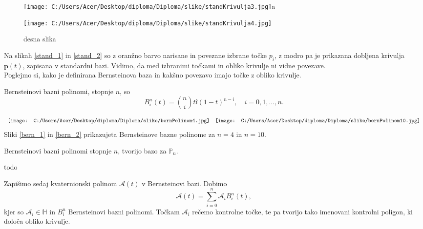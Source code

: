 \documentclass[mat1]{fmfdelo}
\newcommand{\HH}{\mathbb H}
\newcommand{\pp}{\boldsymbol p}
\newcommand{\A}{\mathcal A}
\begin{document}
\begin{figure}[ht!]

\texttt{[image: C:/Users/Acer/Desktop/diploma/Diploma/slike/standKrivulja3.jpg]}{a}

\end{figure}
 \begin{figure}[ht!]
 	\texttt{[image: C:/Users/Acer/Desktop/diploma/Diploma/slike/standKrivulja4.jpg]}
 	\caption{desna slika}
 \end{figure}


Na slikah \ref{stand_1} in \ref{stand_2} so z oranžno barvo narisane in povezane izbrane točke $p_i$, z modro pa je prikazana dobljena krivulja $\pp(t)$, zapisana v standardni bazi.
Vidimo, da med izbranimi točkami in obliko krivulje ni vidne povezave. \\

Poglejmo si, kako je definirana Bernsteinova baza in kakšno povezavo imajo točke z obliko krivulje.
\begin{definicija}
Bernsteinovi bazni polinomi, stopnje $n$, so
\begin{equation*}
B_i^n(t) = \binom{n}{i} tî (1-t)^{n-i}, \quad i=0,1,\dots,n.
\end{equation*}
\end{definicija}
\begin{equation*}
\begin{array}{c c}
\texttt{[image: C:/Users/Acer/Desktop/diploma/Diploma/slike/bernPolinom4.jpg]} &
\texttt{[image: C:/Users/Acer/Desktop/diploma/Diploma/slike/bernPolinom10.jpg]}
\end{array}
\end{equation*}
Sliki \ref{bern_1} in \ref{bern_2} prikazujeta Bernsteinove bazne polinome za $n = 4$ in $n= 10$.
\begin{trditev}
	Bernsteinovi bazni polinomi stopnje $n$, tvorijo bazo za $\mathbb{P}_n$.
\end{trditev}
\begin{dokaz}
	todo
\end{dokaz}

Zapišimo sedaj kvaternionski polinom $\A(t)$ v Bernsteinovi bazi. Dobimo
\begin{equation*}
\A(t) = \sum_{i=0}^n \A_i B_i^n(t),
\end{equation*}
kjer so $\A_i \in \HH$ in $B_i^n$ Bernsteinovi bazni polinomi. Točkam $\A_i$ rečemo kontrolne točke, te pa tvorijo tako imenovani kontrolni poligon, ki določa obliko krivulje.
\end{document}
